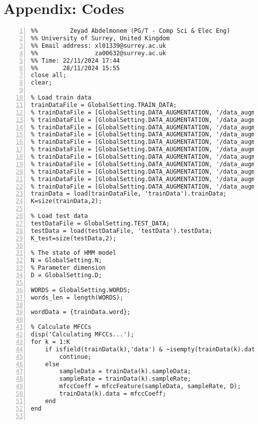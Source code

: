 \documentclass{article}
\begin{document}
\section{Appendix: Codes}

\begin{lstlisting}[frame=single, numbers=left, style=Matlab-editor, caption={train\_model.m}, label={lst:train_model}]
  %% Author: Xiaoguang Liang (PG/T - Comp Sci & Elec Eng)
%%         Zeyad Abdelmonem (PG/T - Comp Sci & Elec Eng)
%% University of Surrey, United Kingdom
%% Email address: xl01339@surrey.ac.uk
%%                za00632@surrey.ac.uk
%% Time: 22/11/2024 17:44
%%       28/11/2024 15:55
close all;
clear;

% Load train data
trainDataFile = GlobalSetting.TRAIN_DATA;
% trainDataFile = [GlobalSetting.DATA_AUGMENTATION, '/data_augmentation_male_x1.mat'];
% trainDataFile = [GlobalSetting.DATA_AUGMENTATION, '/data_augmentation_male_x2.mat'];
% trainDataFile = [GlobalSetting.DATA_AUGMENTATION, '/data_augmentation_male_x3.mat'];
% trainDataFile = [GlobalSetting.DATA_AUGMENTATION, '/data_augmentation_male_x5.mat'];
% trainDataFile = [GlobalSetting.DATA_AUGMENTATION, '/data_augmentation_male_x10.mat'];
% trainDataFile = [GlobalSetting.DATA_AUGMENTATION, '/data_augmentation_male_x50.mat'];
% trainDataFile = [GlobalSetting.DATA_AUGMENTATION, '/data_augmentation_word_x2.mat'];
% trainDataFile = [GlobalSetting.DATA_AUGMENTATION, '/data_augmentation_word_x5.mat'];
% trainDataFile = [GlobalSetting.DATA_AUGMENTATION, '/data_augmentation_male_word_x5.mat'];
% trainDataFile = [GlobalSetting.DATA_AUGMENTATION, '/data_augmentation_male__x5_female.mat'];
% trainDataFile = [GlobalSetting.DATA_AUGMENTATION, '/data_augmentation_male__x5_word_x3.mat'];
trainData = load(trainDataFile, 'trainData').trainData;
K=size(trainData,2);

% Load test data
testDataFile = GlobalSetting.TEST_DATA;
testData = load(testDataFile, 'testData').testData;
K_test=size(testData,2);

% The state of HMM model
N = GlobalSetting.N;
% Parameter dimension
D = GlobalSetting.D;

WORDS = GlobalSetting.WORDS;
words_len = length(WORDS);

wordData = {trainData.word};

% Calculate MFCCs
disp('Calculating MFCCs...');
for k = 1:K
    if isfield(trainData(k),'data') & ~isempty(trainData(k).data)
        continue;
    else
        sampleData = trainData(k).sampleData;
        sampleRate = trainData(k).sampleRate;
        mfccCoeff = mfccFeature(sampleData, sampleRate, D);
        trainData(k).data = mfccCoeff;
    end
end


\end{lstlisting}
\end{document}

